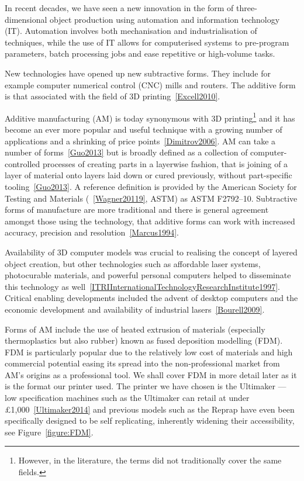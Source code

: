 \documentclass[11pt]{report} %
\begin{document}
In recent decades, we have seen a new innovation in the form of three-dimensional object production using automation and information technology (IT). Automation involves both mechanisation and industrialisation of techniques, while the use of IT allows for computerised systems to pre-program parameters, batch processing jobs and ease repetitive or high-volume tasks.

New technologies have opened up new subtractive forms. They include for example computer numerical control (CNC) mills and routers. The additive form is that associated with the field of 3D printing~\ref{Excell2010}. 

Additive manufacturing (AM) is today synonymous with 3D printing\footnote{However, in the literature, the terms did not traditionally cover the same fields.} and it has become an ever more popular and useful technique with a growing number of applications and a shrinking of price points~\ref{Dimitrov2006}. AM can take a number of forms~\ref{Guo2013} but is broadly defined as a collection of computer-controlled processes of creating parts in a layerwise fashion, that is joining of a layer of material onto layers laid down or cured previously, without part-specific tooling~\ref{Guo2013}. A reference definition is provided by the American Society for Testing and Materials (~\ref{Wagner20119}, ASTM) as ASTM F2792–10. Subtractive forms of manufacture are more traditional and there is general agreement amongst those using the technology, that additive forms can work with increased accuracy, precision and resolution~\ref{Marcus1994}.

Availability of 3D computer models was crucial to realising the concept of layered object creation, but other technologies such as affordable laser systems, photocurable materials, and powerful personal computers helped to disseminate this technology as well~\ref{ITRIInternationalTechnologyResearchInstitute1997}. Critical enabling developments included the advent of desktop computers and the economic development and availability of industrial lasers~\ref{Bourell2009}.

Forms of AM include the use of heated extrusion of materials (especially thermoplastics but also rubber) known as fused deposition modelling (FDM). FDM is particularly popular due to the relatively low cost of materials and high commercial potential easing its spread into the non-professional market from AM's origins as a professional tool. We shall cover FDM in more detail later as it is the format our printer used. The printer we have chosen is the Ultimaker --- low specification machines such as the Ultimaker can retail at under £1,000~\ref{Ultimaker2014} and previous models such as the Reprap have even been specifically designed to be self replicating, inherently widening their accessibility, see Figure~\ref{figure:FDM}.
\end{document}
